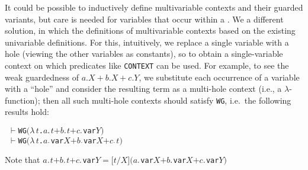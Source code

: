\documentclass[GCNS]{yincog}
\renewcommand{\HOLinline}[1]{\mbox{\textup{\texttt{#1}}}}
\renewcommand{\HOLConst}[1]{\texttt{#1}}
\renewcommand{\HOLBoundVar}[1]{\ensuremath{\mathit{#1}}}
\renewcommand{\HOLFreeVar}[1]{\ensuremath{\mathit{#1}}}
\renewcommand{\HOLSymConst}[1]{#1}
\renewcommand{\HOLTokenLambda}{\ensuremath{\lambda \,}}
\renewcommand{\HOLTokenTurnstile}{\ensuremath{\:\:\vdash}}
\theoremstyle{remark}
\theoremstyle{theorem}
\theoremstyle{remark}
\newcommand{\univariate}{univariable\xspace}
\newcommand{\multivariate}{multivariable\xspace}
\begin{document}
It could be possible to inductively define \multivariate contexts and their
guarded variants, but care is needed for variables that occur within a
.
We  a different solution, in which the definitions
of \multivariate contexts  based on the existing \univariate definitions.
For this, intuitively, we replace a single variable with a hole (viewing
the other variables as constants), so to obtain a single-variable context
on which predicates like \HOLinline{\HOLConst{CONTEXT}} can be used. For
example, to see the weak guardedness of $a.X + b.X + c.Y$, we substitute
each occurrence of a variable with a ``hole'' and consider the resulting
term as a multi-hole context (i.e., a $\lambda $-function); then all such
multi-hole contexts should satisfy \HOLinline{\HOLConst{WG}}, i.e.~the
following results hold:
%
\begin{alltt}
\HOLTokenTurnstile{} \HOLConst{WG} \ensuremath{(}\HOLTokenLambda{}\HOLBoundVar{t}. \HOLFreeVar{a}\HOLSymConst{\ensuremath{\ldotp}}\HOLBoundVar{t} \HOLSymConst{\ensuremath{+}} \HOLFreeVar{b}\HOLSymConst{\ensuremath{\ldotp}}\HOLBoundVar{t} \HOLSymConst{\ensuremath{+}} \HOLFreeVar{c}\HOLSymConst{\ensuremath{\ldotp}}\HOLConst{var} \HOLFreeVar{Y}\ensuremath{)}
\HOLTokenTurnstile{} \HOLConst{WG} \ensuremath{(}\HOLTokenLambda{}\HOLBoundVar{t}. \HOLFreeVar{a}\HOLSymConst{\ensuremath{\ldotp}}\HOLConst{var} \HOLFreeVar{X} \HOLSymConst{\ensuremath{+}} \HOLFreeVar{b}\HOLSymConst{\ensuremath{\ldotp}}\HOLConst{var} \HOLFreeVar{X} \HOLSymConst{\ensuremath{+}} \HOLFreeVar{c}\HOLSymConst{\ensuremath{\ldotp}}\HOLBoundVar{t}\ensuremath{)}
\end{alltt}
%
Note that
\HOLinline{\HOLFreeVar{a}\HOLSymConst{\ensuremath{\ldotp}}\HOLFreeVar{t}\\\;\HOLSymConst{\ensuremath{+}}\\\;\HOLFreeVar{b}\HOLSymConst{\ensuremath{\ldotp}}\HOLFreeVar{t}\\\;\HOLSymConst{\ensuremath{+}}\\\;\HOLFreeVar{c}\HOLSymConst{\ensuremath{\ldotp}}\HOLConst{var}\\\;\HOLFreeVar{Y}\\\;\HOLSymConst{\ensuremath{=}}\\\;\ensuremath{[}\HOLFreeVar{t}\ensuremath{/}\HOLFreeVar{X}\ensuremath{]}\\\;\ensuremath{(}\HOLFreeVar{a}\HOLSymConst{\ensuremath{\ldotp}}\HOLConst{var}\\\;\HOLFreeVar{X}\\\;\HOLSymConst{\ensuremath{+}}\\\;\HOLFreeVar{b}\HOLSymConst{\ensuremath{\ldotp}}\HOLConst{var}\\\;\HOLFreeVar{X}\\\;\HOLSymConst{\ensuremath{+}}\\\;\HOLFreeVar{c}\HOLSymConst{\ensuremath{\ldotp}}\HOLConst{var}\\\;\HOLFreeVar{Y}\ensuremath{)}}
\end{document}

